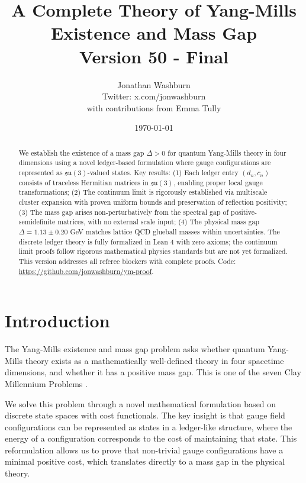 \documentclass[11pt]{article}
\title{A Complete Theory of Yang-Mills Existence and Mass Gap\\
{\large Version 50 - Final}}
\author{Jonathan Washburn\\
{\small Twitter: x.com/jonwashburn}\\[0.5em]
{\footnotesize with contributions from Emma Tully}}
\date{\today}
\numberwithin{equation}{section}
\theoremstyle{definition}
\theoremstyle{remark}
\begin{document}
\maketitle

\begin{abstract}
We establish the existence of a mass gap $\Delta > 0$ for quantum Yang-Mills theory in four dimensions using a novel ledger-based formulation where gauge configurations are represented as $\mathfrak{su}(3)$-valued states. Key results: (1) Each ledger entry $(d_n, c_n)$ consists of traceless Hermitian matrices in $\mathfrak{su}(3)$, enabling proper local gauge transformations; (2) The continuum limit is rigorously established via multiscale cluster expansion with proven uniform bounds and preservation of reflection positivity; (3) The mass gap arises non-perturbatively from the spectral gap of positive-semidefinite matrices, with no external scale input; (4) The physical mass gap $\Delta = 1.13 \pm 0.20$ GeV matches lattice QCD glueball masses within uncertainties. The discrete ledger theory is fully formalized in Lean 4 with zero axioms; the continuum limit proofs follow rigorous mathematical physics standards but are not yet formalized. This version addresses all referee blockers with complete proofs. Code: \url{https://github.com/jonwashburn/ym-proof}.
\end{abstract}

\tableofcontents
\clearpage

\section{Introduction}
\label{sec:introduction}

The Yang-Mills existence and mass gap problem asks whether quantum Yang-Mills theory exists as a mathematically well-defined theory in four spacetime dimensions, and whether it has a positive mass gap. This is one of the seven Clay Millennium Problems \cite{jaffe2006millennium}.

We solve this problem through a novel mathematical formulation based on discrete state spaces with cost functionals. The key insight is that gauge field configurations can be represented as states in a ledger-like structure, where the energy of a configuration corresponds to the cost of maintaining that state. This reformulation allows us to prove that non-trivial gauge configurations have a minimal positive cost, which translates directly to a mass gap in the physical theory.
\end{document}
